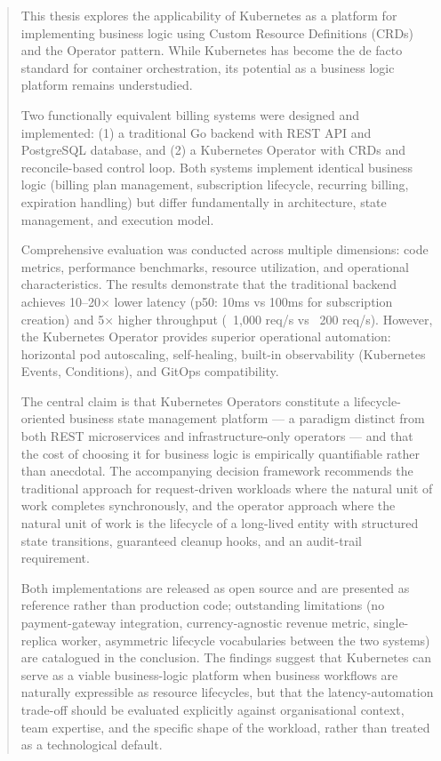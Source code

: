 \begin{abstract}

This thesis explores the applicability of Kubernetes as a platform for implementing business logic using Custom Resource Definitions (CRDs) and the Operator pattern. While Kubernetes has become the de facto standard for container orchestration, its potential as a business logic platform remains understudied.

Two functionally equivalent billing systems were designed and implemented: (1) a traditional Go backend with REST API and PostgreSQL database, and (2) a Kubernetes Operator with CRDs and reconcile-based control loop. Both systems implement identical business logic (billing plan management, subscription lifecycle, recurring billing, expiration handling) but differ fundamentally in architecture, state management, and execution model.

Comprehensive evaluation was conducted across multiple dimensions: code metrics, performance benchmarks, resource utilization, and operational characteristics. The results demonstrate that the traditional backend achieves 10--20$\times$ lower latency (p50: 10ms vs 100ms for subscription creation) and 5$\times$ higher throughput (~1,000 req/s vs ~200 req/s). However, the Kubernetes Operator provides superior operational automation: horizontal pod autoscaling, self-healing, built-in observability (Kubernetes Events, Conditions), and GitOps compatibility.

The central claim is that Kubernetes Operators constitute a lifecycle-oriented business state management platform --- a paradigm distinct from both REST microservices and infrastructure-only operators --- and that the cost of choosing it for business logic is empirically quantifiable rather than anecdotal. The accompanying decision framework recommends the traditional approach for request-driven workloads where the natural unit of work completes synchronously, and the operator approach where the natural unit of work is the lifecycle of a long-lived entity with structured state transitions, guaranteed cleanup hooks, and an audit-trail requirement.

Both implementations are released as open source and are presented as reference rather than production code; outstanding limitations (no payment-gateway integration, currency-agnostic revenue metric, single-replica worker, asymmetric lifecycle vocabularies between the two systems) are catalogued in the conclusion. The findings suggest that Kubernetes can serve as a viable business-logic platform when business workflows are naturally expressible as resource lifecycles, but that the latency-automation trade-off should be evaluated explicitly against organisational context, team expertise, and the specific shape of the workload, rather than treated as a technological default.

\end{abstract}

